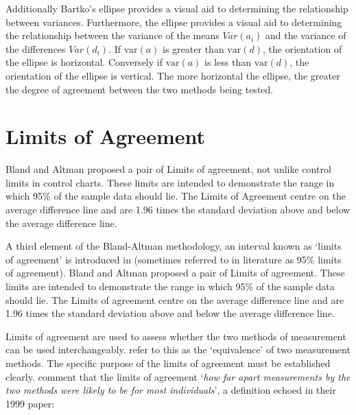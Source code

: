 \documentclass[12pt, a4paper]{report}
\theoremstyle{plain}
\theoremstyle{definition}
\theoremstyle{remark}
\begin{document}




Additionally Bartko's ellipse provides a visual aid to determining the
relationship between variances. 
Furthermore, the ellipse provides a visual aid to determining the relationship
between the variance of the means $Var(a_{i})$ and the variance of the differences $Var(d_{i})$. If $\mbox{var}(a)$ is greater than $\mbox{var}(d)$, the orientation of the ellipse is horizontal. Conversely if $\mbox{var}(a)$ is less than $\mbox{var}(d)$, the orientation of the ellipse is vertical. The more horizontal the ellipse, the greater the degree of agreement between the two methods being tested.








\section{Limits of Agreement}
	Bland and Altman proposed a pair of Limits of agreement, not unlike control limits in control charts. These
	limits are intended to demonstrate the range in which 95\% of the sample data should lie. The Limits of Agreement centre on the
	average difference line and are 1.96 times the standard deviation above and below the average difference line.
	


A third element of the Bland-Altman methodology, an interval known
as `limits of agreement' is introduced in \citet*{BA86}
(sometimes referred to in literature as 95\% limits of agreement). Bland and Altman proposed a pair of Limits of agreement. These
limits are intended to demonstrate the range in which 95\% of the
sample data should lie. The Limits of agreement centre on the
average difference line and are 1.96 times the standard deviation
above and below the average difference line.

Limits of agreement are used to assess whether the two methods of measurement can be used interchangeably. \citet{BA86} refer to
this as the `equivalence' of two measurement methods. The specific purpose of the limits of
agreement must be
established clearly. \citet*{BA95} comment that the limits of agreement `\textit{how
	far apart measurements by the two methods were likely to be for
	most individuals}', a definition echoed in their 1999 paper:
\end{document}

